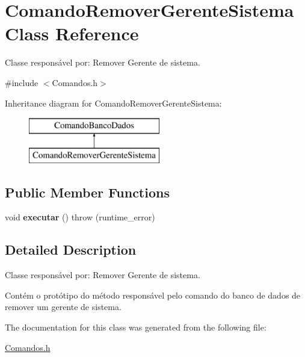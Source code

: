 \hypertarget{class_comando_remover_gerente_sistema}{}\section{Comando\+Remover\+Gerente\+Sistema Class Reference}
\label{class_comando_remover_gerente_sistema}


Classe responsável por\+: Remover Gerente de sistema.  




{\ttfamily \#include $<$Comandos.\+h$>$}

Inheritance diagram for Comando\+Remover\+Gerente\+Sistema\+:\begin{figure}[H]
\begin{center}
\leavevmode
\includegraphics[height=2.000000cm]{class_comando_remover_gerente_sistema}
\end{center}
\end{figure}
\subsection*{Public Member Functions}
\begin{DoxyCompactItemize}
\item 
\hypertarget{class_comando_remover_gerente_sistema_a82299b1efa9133c3b0058a9d119445d0}{}\label{class_comando_remover_gerente_sistema_a82299b1efa9133c3b0058a9d119445d0} 
void {\bfseries executar} ()  throw (runtime\+\_\+error)
\end{DoxyCompactItemize}


\subsection{Detailed Description}
Classe responsável por\+: Remover Gerente de sistema. 

Contém o protótipo do método responsável pelo comando do banco de dados de remover um gerente de sistema. 

The documentation for this class was generated from the following file\+:\begin{DoxyCompactItemize}
\item 
\hyperlink{_comandos_8h}{Comandos.\+h}\end{DoxyCompactItemize}
